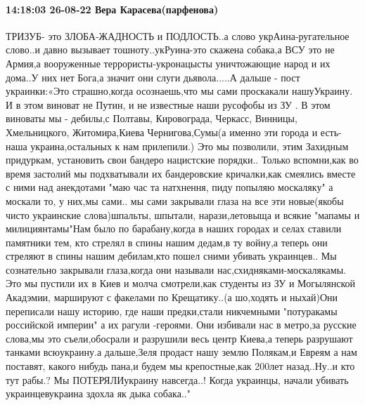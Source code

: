  
 
 
 
 

\paragraph{14:18:03 26-08-22 Вера Карасева(парфенова)}

ТРИЗУБ- это ЗЛОБА-ЖАДНОСТЬ и ПОДЛОСТЬ..а слово укрАина-ругательное слово..и давно вызывает тошноту..укРуина-это скажена собака,а ВСУ это не Армия,а вооруженные террористы-укронацысты уничтожающие народ и их дома..У них нет Бога,а значит они слуги дьявола.....А дальше - пост украинки:«Это страшно,когда осознаешь,что мы сами проскакали нашуУкраину. И в этом виноват не Путин, и не известные наши русофобы из ЗУ . В этом виноваты мы - дебилы,с Полтавы, Кировограда, Черкасс, Винницы, Хмельницкого, Житомира,Киева Чернигова,Сумы(а именно эти города и есть-наша украина,остальных к нам прилепили.) Это мы позволили, этим Захидным придуркам, установить свои бандеро нацистские порядки.. Только вспомни,как во время застолий мы подхватывали их бандеровские кричалки,как смеялись вместе с ними над анекдотами "маю час та натхнення, пиду попыляю москаляку" а москали то, у них,мы сами.. мы сами закрывали глаза на все эти новые(якобы чисто украинские слова)шпальты, шпытали, нарази,летовыща и всякие "мапамы и милициянтамы"Нам было по барабану,когда в наших городах и селах ставили памятники тем, кто стрелял в спины нашим дедам,в ту войну,а теперь они стреляют в спины нашим дебилам,кто пошел сними убивать украинцев..
Мы сознательно закрывали глаза,когда они называли нас,схидняками-москалякамы.
Это мы пустили их в Киев и молча смотрели,как студенты из ЗУ и Могылянской Акадэмии, маршируют с факелами по Крещатику..(а шо,ходять и ныхай)Они переписали нашу историю, где наши предки,стали никчемными "потуракамы российской империи" а их рагули -героями. Они избивали нас в метро,за русские слова,мы это съели,обосрали и разрушили весь центр Киева,а теперь разрушают танками всюукраину.а дальше,Зеля продаст нашу землю Полякам,и Евреям а нам поставят, какого нибудь пана,и будем мы крепостные,как 200лет назад..Ну..и кто тут рабы.?
Мы ПОТЕРЯЛИукраину навсегда..! Когда украинцы, начали убивать украинцевукраина здохла як дыка собака.."
